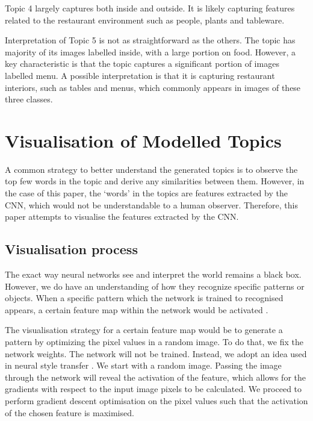 \documentclass{article}
\begin{document}
Topic 4 largely captures both inside and outside. It is likely capturing features related to the restaurant environment such as people, plants and tableware. 

Interpretation of Topic 5 is not as straightforward as the others. The topic has majority of its images labelled inside, with a large portion on food. However, a key characteristic is that the topic captures a significant portion of images labelled menu. A possible interpretation is that it is capturing restaurant interiors, such as tables and menus, which commonly appears in images of these three classes.

\section{Visualisation of Modelled Topics}
A common strategy to better understand the generated topics is to observe the top few words in the topic and derive any similarities between them. However, in the case of this paper, the `words' in the topics are features extracted by the CNN, which would not be understandable to a human observer. Therefore, this paper attempts to visualise the features extracted by the CNN. 

\subsection{Visualisation process}
The exact way neural networks see and interpret the world remains a black box. However, we do have an understanding of how they recognize specific patterns or objects. When a specific pattern which the network is trained to recognised appears, a certain feature map within the network would be activated \cite{visualcnn}. 

The visualisation strategy for a certain feature map would be to generate a pattern by optimizing the pixel values in a random image. To do that, we fix the network weights. The network will not be trained. Instead, we adopt an idea used in neural style transfer \cite{nstyletransfer}. We start with a random image. Passing the image through the network will reveal the activation of the feature, which allows for the gradients with respect to the input image pixels to be calculated. We proceed to perform gradient descent optimisation on the pixel values such that the activation of the chosen feature is maximised.
\end{document}
